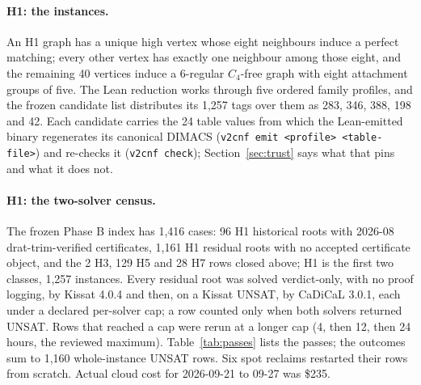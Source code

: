 \documentclass{anvil-paper}
\theoremstyle{definition}
\begin{document}
\paragraph{H1: the instances.} An H1 graph has a unique high vertex whose eight neighbours induce a perfect matching; every other vertex has exactly one neighbour among those eight, and the remaining 40 vertices induce a 6-regular $C_4$-free graph with eight attachment groups of five. The Lean reduction  works through five ordered family profiles, and the frozen candidate list distributes its 1,257 tags over them as 283, 346, 388, 198 and 42. Each candidate carries the 24 table values from which the Lean-emitted binary regenerates its canonical DIMACS (\texttt{v2cnf emit <profile> <table-file>}) and re-checks it (\texttt{v2cnf check}); Section~\ref{sec:trust} says what that pins and what it does not.

\paragraph{H1: the two-solver census.} The frozen Phase B index has 1,416 cases: 96 H1 historical roots with 2026-08 drat-trim-verified certificates, 1,161 H1 residual roots with no accepted certificate object, and the 2 H3, 129 H5 and 28 H7 rows closed above; H1 is the first two classes, 1,257 instances. Every residual root was solved verdict-only, with no proof logging, by Kissat 4.0.4 and then, on a Kissat UNSAT, by CaDiCaL 3.0.1, each under a declared per-solver cap; a row counted only when both solvers returned UNSAT. Rows that reached a cap were rerun at a longer cap (4, then 12, then 24 hours, the reviewed maximum). Table~\ref{tab:passes} lists the passes; the outcomes sum to 1,160 whole-instance UNSAT rows. Six spot reclaims restarted their rows from scratch. Actual cloud cost for 2026-09-21 to 09-27 was \$235.
\end{document}
